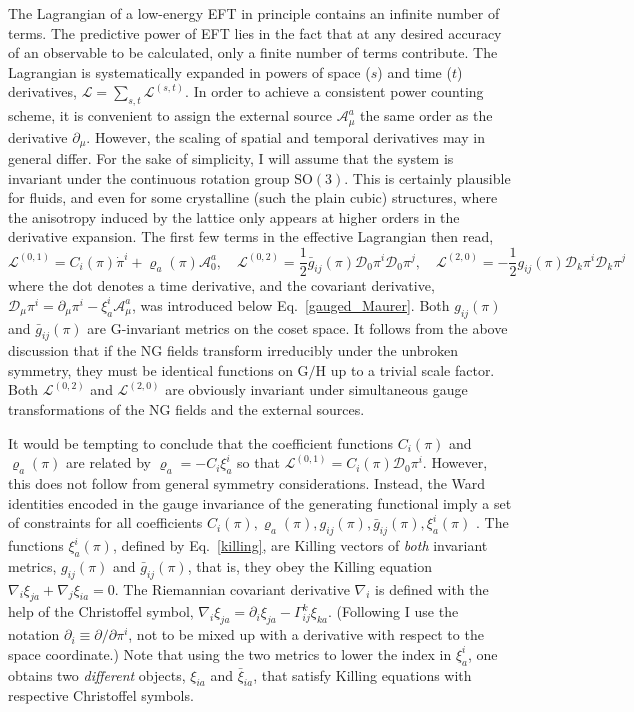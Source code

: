 \documentclass[final,3p,times,12pt,a4paper,sort&compress]{elsarticle}
\newcommand\gr[1]{\mathrm{#1}}              %
\newcommand\Lag{\mathscr{L}}                %
\newcommand\DD{\mathscr{D}}                 %
\newcommand\AAA{\mathscr{A}}                %
\newcommand\de{\partial}
\newcommand\vr{\varrho}
\newcommand\Pd[2]{\partial #1/\partial #2}  %
\begin{document}
The Lagrangian of a low-energy EFT in principle contains an infinite number of
terms. The predictive power of EFT lies in the fact that at any desired
accuracy of an observable to be calculated, only a finite number of terms
contribute. The Lagrangian is systematically expanded in powers of space ($s$)
and time ($t$) derivatives, $\Lag=\sum_{s,t}\Lag^{(s,t)}$. In order to achieve
a consistent power counting scheme, it is convenient to assign the external
source $\AAA^a_\mu$ the same order as the derivative $\de_\mu$. However, the
scaling of spatial and temporal derivatives may in general differ. For the sake
of simplicity, I will assume that the system is invariant under the continuous
rotation group $\gr{SO(3)}$. This is certainly plausible for fluids, and even
for some crystalline (such the plain cubic) structures, where the anisotropy
induced by the lattice only appears at higher orders in the derivative
expansion. The first few terms in the effective Lagrangian then read,
\begin{equation}
\Lag^{(0,1)}=C_i(\pi)\dot\pi^i+\vr_a(\pi)\AAA^a_0,\quad
\Lag^{(0,2)}=\frac12\bar g_{ij}(\pi)\DD_0\pi^i\DD_0\pi^j,\quad
\Lag^{(2,0)}=-\frac12g_{ij}(\pi)\DD_k\pi^i\DD_k\pi^j
\end{equation}
where the dot denotes a time derivative, and the covariant derivative,
$\DD_\mu\pi^i=\de_\mu\pi^i-\xi^i_a\AAA^a_\mu$, was introduced below
Eq.~\eqref{gauged_Maurer}. Both $g_{ij}(\pi)$ and $\bar
g_{ij}(\pi)$ are $\gr G$-invariant metrics on the coset space. It follows from
the above discussion that if the NG fields transform irreducibly under the
unbroken symmetry, they must be identical functions on $\gr{G/H}$ up to a
trivial scale factor. Both $\Lag^{(0,2)}$ and $\Lag^{(2,0)}$ are obviously
invariant under simultaneous gauge transformations of the NG fields and the
external sources.

It would be tempting to conclude that the coefficient functions $C_i(\pi)$ and
$\vr_a(\pi)$ are related by $\vr_a=-C_i\xi^i_a$ so that
$\Lag^{(0,1)}=C_i(\pi)\DD_0\pi^i$. However, this does not follow from general
symmetry considerations. Instead, the Ward identities encoded in the gauge
invariance of the generating functional imply a set of constraints for all
coefficients $C_i(\pi),\vr_a(\pi),g_{ij}(\pi),\bar g_{ij}(\pi),\xi^i_a(\pi)$
\cite{Leutwyler:1993gf}. The functions $\xi^i_a(\pi)$, defined by
Eq.~\eqref{killing}, are Killing vectors of \emph{both} invariant metrics,
$g_{ij}(\pi)$ and $\bar g_{ij}(\pi)$, that is, they obey the Killing
equation $\nabla_i\xi_{ja}+\nabla_j\xi_{ia}=0$. The Riemannian covariant
derivative $\nabla_i$ is defined with the help of the Christoffel symbol,
$\nabla_i\xi_{ja}=\de_i\xi_{ja}-\Gamma^k_{ij}\xi_{ka}$. (Following
\cite{Leutwyler:1993gf} I use the notation $\de_i\equiv\Pd{}{\pi^i}$, not to be
mixed up with a derivative with respect to the space coordinate.) Note
that using the two metrics to lower the index in $\xi^i_a$, one obtains two
\emph{different} objects, $\xi_{ia}$ and $\bar\xi_{ia}$, that satisfy Killing
equations with respective Christoffel symbols.
\end{document}
